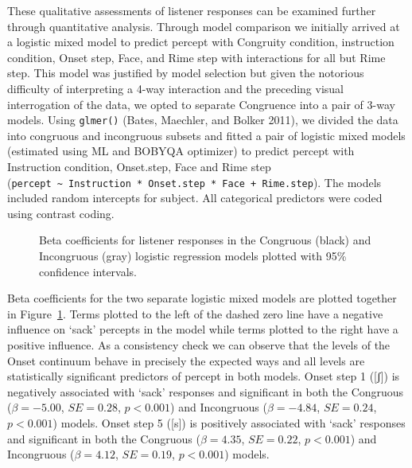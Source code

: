 \documentclass[
  letterpaper,
  DIV=11,
  numbers=noendperiod]{scrartcl}
\begin{document}
These qualitative assessments of listener responses can be examined
further through quantitative analysis. Through model comparison we
initially arrived at a logistic mixed model to predict percept with
Congruity condition, instruction condition, Onset step, Face, and Rime
step with interactions for all but Rime step. This model was justified
by model selection but given the notorious difficulty of interpreting a
4-way interaction and the preceding visual interrogation of the data, we
opted to separate Congruence into a pair of 3-way models. Using
\texttt{glmer()} (Bates, Maechler, and Bolker 2011), we divided the data
into congruous and incongruous subsets and fitted a pair of logistic
mixed models (estimated using ML and BOBYQA optimizer) to predict
percept with Instruction condition, Onset.step, Face and Rime step
(\texttt{percept\ \textasciitilde{}\ Instruction\ *\ Onset.step\ *\ Face\ +\ Rime.step}).
The models included random intercepts for subject. All categorical
predictors were coded using contrast coding.

\begin{figure}


\caption{\label{fig-coefs}Beta coefficients for listener responses in
the Congruous (black) and Incongruous (gray) logistic regression models
plotted with 95\% confidence intervals.}

\end{figure}%

Beta coefficients for the two separate logistic mixed models are plotted
together in Figure~\ref{fig-coefs}. Terms plotted to the left of the
dashed zero line have a negative influence on `sack' percepts in the
model while terms plotted to the right have a positive influence. As a
consistency check we can observe that the levels of the Onset continuum
behave in precisely the expected ways and all levels are statistically
significant predictors of percept in both models. Onset step 1 ({[}ʃ{]})
is negatively associated with `sack' responses and significant in both
the Congruous (\(β=-5.00\), \(SE=0.28\), \(p < 0.001\)) and Incongruous
(\(β=-4.84\), \(SE=0.24\), \(p < 0.001\)) models. Onset step 5 ({[}s{]})
is positively associated with `sack' responses and significant in both
the Congruous (\(β=4.35\), \(SE=0.22\), \(p < 0.001\)) and Incongruous
(\(β=4.12\), \(SE=0.19\), \(p < 0.001\)) models.
\end{document}
